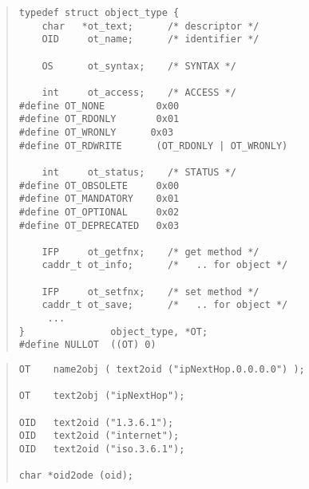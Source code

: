 



\begin{bwslide}

\begin{quote}\smaller\begin{verbatim}
typedef struct object_type {
    char   *ot_text;      /* descriptor */
    OID     ot_name;      /* identifier */

    OS      ot_syntax;    /* SYNTAX */

    int     ot_access;    /* ACCESS */
#define OT_NONE         0x00
#define OT_RDONLY       0x01
#define OT_WRONLY      0x03
#define OT_RDWRITE      (OT_RDONLY | OT_WRONLY)

    int     ot_status;    /* STATUS */
#define OT_OBSOLETE     0x00
#define OT_MANDATORY    0x01
#define OT_OPTIONAL     0x02
#define OT_DEPRECATED   0x03

    IFP     ot_getfnx;    /* get method */
    caddr_t ot_info;      /*   .. for object */

    IFP     ot_setfnx;    /* set method */
    caddr_t ot_save;      /*   .. for object */
     ...
}               object_type, *OT;
#define NULLOT  ((OT) 0)
\end{verbatim}\end{quote}
\end{bwslide}


\begin{bwslide}

\begin{quote}\small\begin{verbatim}
OT    name2obj ( text2oid ("ipNextHop.0.0.0.0") );

OT    text2obj ("ipNextHop");

OID   text2oid ("1.3.6.1");
OID   text2oid ("internet");
OID   text2oid ("iso.3.6.1");

char *oid2ode (oid);
\end{verbatim}\end{quote}
\end{bwslide}


